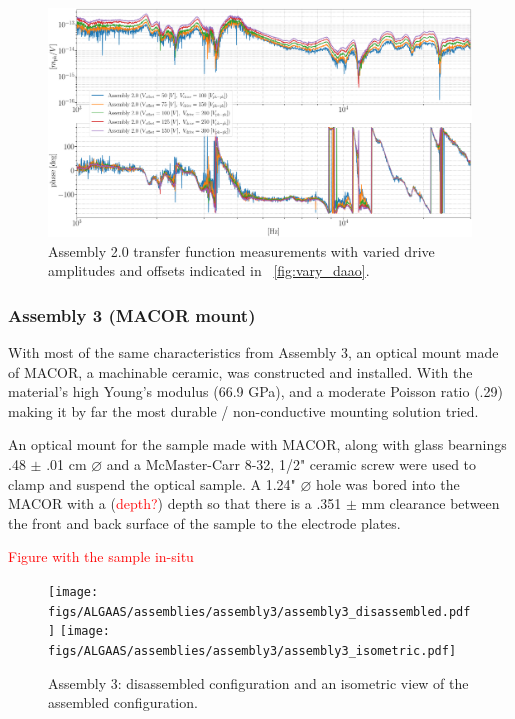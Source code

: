 \begin{figure}[H]
    \includegraphics[width=\textwidth]{figs/ALGAAS/results_figs/assembly2/vvao517.pdf} 
    \caption{Assembly 2.0 transfer function measurements with varied drive amplitudes and offsets indicated in ~\ref{fig:vary_daao}.}
    \label{fig:vvao517}
\end{figure}

\subsubsection{Assembly 3 (MACOR mount)}
With most of the same characteristics from Assembly 3, an optical mount made of MACOR, a machinable ceramic, was constructed and installed. With the material's high Young's modulus (66.9 GPa), and a moderate Poisson ratio (.29) \cite{macor} making it by far the most durable / non-conductive mounting solution tried.

An optical mount for the sample made with MACOR, along with glass bearnings .48 $\pm$ .01 cm $\diameter$  and a McMaster-Carr 8-32, 1/2" ceramic screw were used to clamp and suspend the optical sample. A 1.24" $\diameter$ hole was bored into the MACOR with a (\textcolor{red}{depth?}) depth so that there is a .351 $\pm$ mm clearance between the front and back surface of the sample to the electrode plates.

\textcolor{red}{Figure with the sample in-situ}
\begin{figure}[!h]
    \begin{subcaptiongroup}
	    \texttt{[image: figs/ALGAAS/assemblies/assembly3/assembly3\_disassembled.pdf]}
	    \label{A3_disassembled}
	    \texttt{[image: figs/ALGAAS/assemblies/assembly3/assembly3\_isometric.pdf]}
	    \label{A3_isometric}
    \end{subcaptiongroup}
    \caption{Assembly 3:  disassembled configuration and  an isometric view of the assembled configuration.}
    \label{fig:assembly3}
\end{figure}


